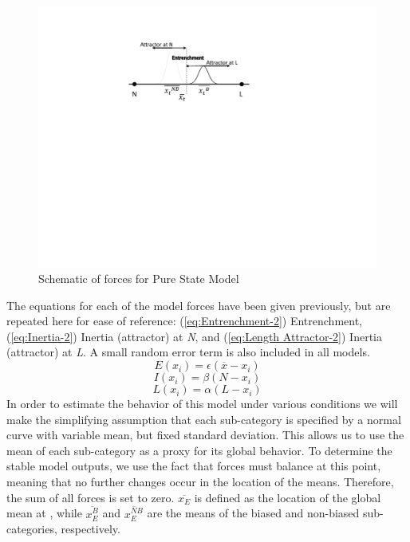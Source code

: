 \begin{figure}[H]
\begin{centering}
\includegraphics[width=.45\textwidth]{figures/Model6Behavior.pdf}\caption{\label{fig:Model G}Schematic of forces for Pure State Model}
\par\end{centering}
\end{figure}

The equations for each of the model forces have been given previously,
but are repeated here for ease of reference: (\ref{eq:Entrenchment-2})
Entrenchment, (\ref{eq:Inertia-2}) Inertia (attractor) at \emph{N},
and (\ref{eq:Length Attractor-2}) Inertia (attractor) at\emph{ L}.
A small random error term is also included in all models. 
\begin{equation}
E(x_{i})=\epsilon(\overline{x}-x_{i})\label{eq:Entrenchment-2}
\end{equation}
\begin{equation}
I(x_{i})=\beta(N-x_{i})\label{eq:Inertia-2}
\end{equation}
\begin{equation}
L(x_{i})=\alpha(L-x_{i})\label{eq:Length Attractor-2}
\end{equation}
In order to estimate the behavior of this model under various conditions
we will make the simplifying assumption that each sub-category is
specified by a normal curve with variable mean, but fixed standard
deviation. This allows us to use the mean of each sub-category as
a proxy for its global behavior. To determine the stable model outputs,
we use the fact that forces must balance at this  point,
meaning that no further changes occur in the location of the means.
Therefore, the sum of all forces is set to zero. $\overline{x_{E}}$
is defined as the location of the global mean at , while
$\overline{x_{E}^{B}}$ and $\overline{x_{E}^{NB}}$ are the 
means of the biased and non-biased sub-categories, respectively. 

